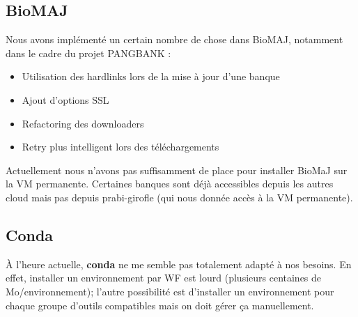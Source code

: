 \subsection{BioMAJ}

Nous avons implémenté un certain nombre de chose dans BioMAJ, notamment dans le cadre du projet PANGBANK :
\begin{itemize}
    \item Utilisation des hardlinks lors de la mise à jour d'une banque
    \item Ajout d'options SSL
    \item Refactoring des downloaders
    \item Retry plus intelligent lors des téléchargements
\end{itemize}
\bigskip

Actuellement nous n'avons pas suffisamment de place pour installer BioMaJ sur la VM permanente.
Certaines banques sont déjà accessibles depuis les autres cloud mais pas depuis prabi-girofle (qui nous donnée accès à la VM permanente).

\subsection{Conda}
À l'heure actuelle, \textbf{conda} ne me semble pas totalement adapté à nos besoins.
En effet, installer un environnement par WF est lourd (plusieurs centaines de Mo/environnement); l'autre possibilité est d'installer un environnement pour chaque groupe d'outils compatibles mais on doit gérer ça manuellement.
